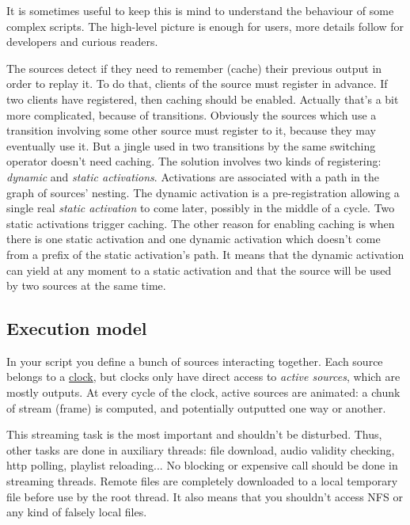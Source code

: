 It is sometimes useful to keep this is mind to understand the behaviour
of some complex scripts. The high-level picture is enough for users,
more details follow for developers and curious readers.

The sources detect if they need to remember (cache) their previous output in 
order to replay it. To do that, clients of the source must register in 
advance. If two clients have registered, then caching should be enabled. 
Actually that's a bit more complicated, because of transitions. Obviously the 
sources which use a transition involving some other source must register to 
it, because they may eventually use it. But a jingle used in two transitions 
by the same switching operator doesn't need caching. The solution involves two 
kinds of registering: \emph{dynamic} and \emph{static activations}. Activations are 
associated with a path in the graph of sources' nesting. The dynamic 
activation is a pre-registration allowing a single real \emph{static activation}
to come later, possibly in the middle of a cycle.
Two static activations trigger caching. The other reason for enabling caching
is when there is one static activation and one dynamic activation which 
doesn't come from a prefix of the static activation's path. It means that the 
dynamic activation can yield at any moment to a static activation and that the 
source will be used by two sources at the same time.

\subsection{Execution model}
In your script you define a bunch of sources interacting together. Each
source belongs to a \href{clocks.html}{clock}, but clocks only have direct access
to \emph{active sources}, which are mostly outputs.
At every cycle of the clock, active sources are animated: a chunk of stream
(frame) is computed, and potentially outputted one way or another.

This streaming task is the most important and shouldn't be disturbed.
Thus, other tasks are done in auxiliary threads:
file download, audio validity checking, http polling, playlist reloading...
No blocking or expensive call should be done in streaming threads.
Remote files are completely downloaded to a local temporary file
before use by the root thread. It also means that you shouldn't access NFS
or any kind of falsely local files.

